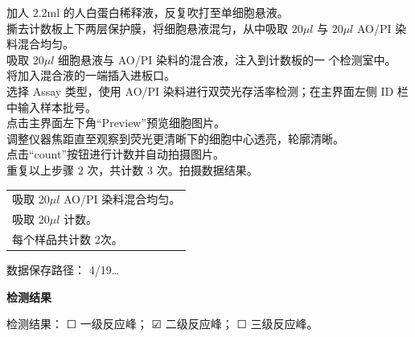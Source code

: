 \documentclass[UTF8,10pt,a4paper,fontset=fandol]{ctexart}
\newcommand{\fieldvalue}[1]{#1}
\newcommand{\handwritten}[1]{#1}
\newcommand{\checkboxfield}[1]{\ifstrequal{#1}{checked}{☑}{\ifstrequal{#1}{unclear}{?}{☐}}}
\begin{document}
\noindent
加人 $2.2\mathrm{ml}$ 的人白蛋白稀释液，反复吹打至单细胞悬液。\\
撕去计数板上下两层保护膜，将细胞悬液混匀，从中吸取 $20\mu l$ 与 $20\mu l$ AO/PI 染料混合均匀。\\
吸取 $20\mu l$ 细胞悬液与 AO/PI 染料的混合液，注入到计数板的一 个检测室中。\\
将加入混合液的一端插入进板口。\\
选择 Assay 类型，使用 AO/PI 染料进行双荧光存活率检测；在主界面左侧 ID 栏中输入样本批号。\\
点击主界面左下角“Preview”预览细胞图片。\\
调整仪器焦距直至观察到荧光更清晰下的细胞中心透亮，轮廓清晰。\\
点击“count”按钮进行计数并自动拍摄图片。\\
重复以上步骤 $2$ 次，共计数 $3$ 次。拍摄数据结果。

\begin{flushright}
\begin{tabular}{@{}l@{}}
吸取
\fieldvalue{\handwritten{20}}$\mu l$ AO/PI 染料混合均匀。\\
吸取
\fieldvalue{\handwritten{20}}$\mu l$ 计数。\\
每个样品共计数
\fieldvalue{\handwritten{2}}次。
\end{tabular}
\end{flushright}

\noindent
数据保存路径：
\fieldvalue{\handwritten{4/19\ldots}}

\medskip

\begin{center}
\textbf{检测结果}
\end{center}

\noindent
检测结果：
\fieldvalue{\checkboxfield{unchecked}} 一级反应峰；
\fieldvalue{\handwritten{\checkboxfield{checked}}} 二级反应峰；
\fieldvalue{\checkboxfield{unchecked}} 三级反应峰。
\end{document}
